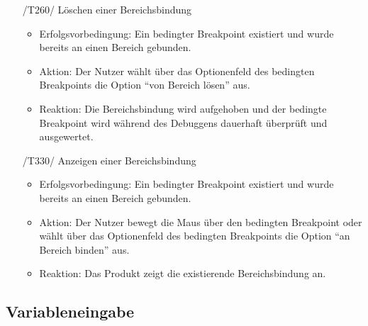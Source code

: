 \documentclass[parskip=full]{scrartcl}
\begin{document}
\begin{itemize}
	\item[/T260/] Löschen einer Bereichsbindung
		\begin{itemize}
		\item Erfolgsvorbedingung: Ein bedingter Breakpoint existiert und wurde bereits an einen Bereich gebunden. 
		\item Aktion: Der Nutzer wählt über das Optionenfeld des bedingten Breakpoints die Option \enquote{von Bereich lösen} aus.
		\item Reaktion:	Die Bereichsbindung wird aufgehoben und der bedingte Breakpoint wird während des Debuggens dauerhaft überprüft und ausgewertet.
		\end{itemize}	
	
	\item[/T330/] Anzeigen einer Bereichsbindung
		\begin{itemize}
		\item Erfolgsvorbedingung: Ein bedingter Breakpoint existiert und wurde bereits an einen Bereich gebunden. 
		\item Aktion: Der Nutzer bewegt die Maus über den bedingten Breakpoint oder wählt über das Optionenfeld des bedingten Breakpoints die Option \enquote{an Bereich binden} aus. 
		\item Reaktion:	Das Produkt zeigt die existierende Bereichsbindung an.  
		\end{itemize}	
	
		
\end{itemize}

\newpage
\subsection{Variableneingabe}
\end{document}

